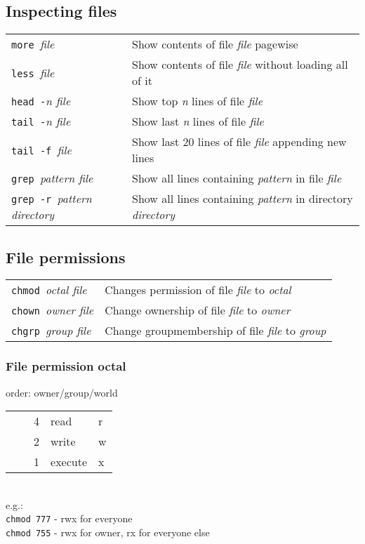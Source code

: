 \subsection{Inspecting files}
\begin{tabular}{@{}p{\the\MyLen}%
				@{}p{\linewidth-\the\MyLen}}
	\verb!more !\textit{file}					& Show contents of file \textit{file} pagewise\\
	\verb!less !\textit{file}					& Show contents of file \textit{file} without loading all of it\\
	\verb!head -!\textit{n file}				& Show top \textit{n} lines of file \textit{file}\\
	\verb!tail -!\textit{n file}				& Show last \textit{n} lines of file \textit{file}\\
	\verb!tail -f !\textit{file}				& Show last 20 lines of file \textit{file} appending new lines\\
	\verb!grep !\textit{pattern file}			& Show all lines containing \textit{pattern} in file \textit{file}\\
	\verb!grep -r !\textit{pattern directory}	& Show all lines containing \textit{pattern} in directory \textit{directory}\\
\end{tabular}

\subsection{File permissions}
\begin{tabular}{@{}p{\the\MyLen}%
				@{}p{\linewidth-\the\MyLen}}
	\verb!chmod !\textit{octal file}	 		& Changes permission of file \textit{file} to \textit{octal}\\
	\verb!chown !\textit{owner file}			& Change ownership of file \textit{file} to \textit{owner}\\
	\verb!chgrp !\textit{group file}			& Change groupmembership of file \textit{file} to \textit{group}\\
\end{tabular}

\subsubsection{File permission octal}
order: owner/group/world\\
\begin{tabular}{llll}
~~ & 4 & read 		& r\\
~~ & 2 & write 		& w\\
~~ & 1 & execute 	& x\\
\end{tabular}\\
e.g.:\\
\verb!chmod 777! - rwx for everyone\\
\verb!chmod 755! - rwx for owner, rx for everyone else\\

